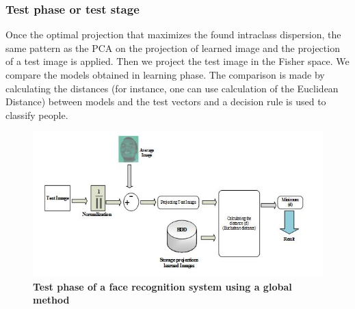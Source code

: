 \subsubsection{Test phase or test stage}
Once the optimal projection that maximizes the found intraclass dispersion, the same pattern as the PCA on the projection of learned image and the projection of a test image is applied.
Then we project the test image in the Fisher space.
We compare the models obtained in learning phase. The comparison is made by calculating the distances (for instance, one can use calculation of the Euclidean Distance) between models and the test vectors and a decision rule is used to classify people.
\begin{figure}[bth]%
\begin{center}
\includegraphics[scale=0.75]{TestphaseGM}%
\caption{\textbf{Test phase of a face recognition system using a global method}}%
\label{TestphaseGM}%
\end {center}
\end{figure}
\newpage
